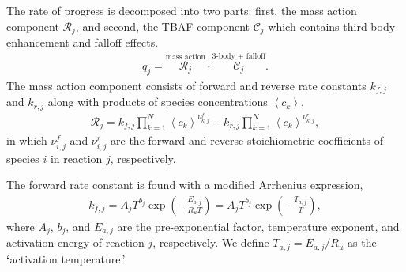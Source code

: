\documentclass[letterpaper,10pt,english]{sphinxmanual}
\begin{document}
The rate of progress is decomposed into two parts: first, the mass action component \(\mathcal{R}_j\), and second, the TBAF component \(\mathcal{C}_j\) which contains third-body enhancement and falloff effects.
\begin{equation}\label{equation:combustion:combustion:4}
\begin{split}q_j = \overset{\text{mass action}}{\mathcal{R}_j}\cdot\overset{\text{3-body + falloff}}{\mathcal{C}_j}.\end{split}
\end{equation}
The mass action component consists of forward and reverse rate constants \(k_{f,j}\) and \(k_{r,j}\) along with products of species concentrations \(\left\langle c_k\right\rangle\),
\begin{equation}\label{equation:combustion:combustion:5}
\begin{split}\mathcal{R}_j = k_{f,j}\prod_{k=1}^{N}\left\langle c_k\right\rangle^{\nu^f_{k,j}} - k_{r,j}\prod_{k=1}^{N}\left\langle c_k\right\rangle^{\nu^r_{k,j}},\end{split}
\end{equation}
in which \(\nu^f_{i,j}\) and \(\nu^r_{i,j}\) are the forward and reverse stoichiometric coefficients of species \(i\) in reaction \(j\), respectively.

The forward rate constant is found with a modified Arrhenius expression,
\begin{equation}\label{equation:combustion:combustion:6}
\begin{split}k_{f,j} = A_j T^{b_j} \exp\left(-\frac{E_{a,j}}{R_u T}\right) = A_j T^{b_j} \exp\left(-\frac{T_{a,j}}{T}\right),\end{split}
\end{equation}
where \(A_j\), \(b_j\), and \(E_{a,j}\) are the pre-exponential factor, temperature exponent, and activation energy of reaction \(j\), respectively.
We define \(T_{a,j}=E_{a,j}/R_u\) as the {\color{red}\bfseries{}{}`}activation temperature.’
\end{document}
